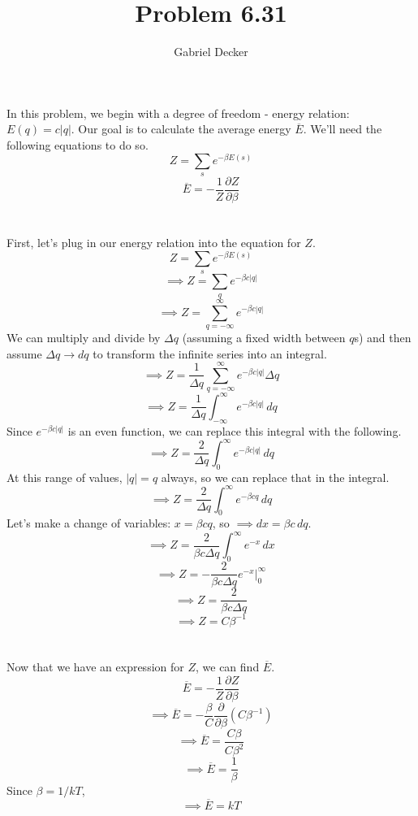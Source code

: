 \documentclass[12pt]{article}
\title{Problem 6.31}
\author{Gabriel Decker}
\newcommand{\partDeriv}[2]{\frac{\partial #1}{\partial #2}}
\begin{document}
\maketitle
\begin{flushleft}

In this problem, we begin with a degree of freedom - energy relation: $E(q)=c|q|$. Our goal is to calculate the average energy $\overline{E}$.
We'll need the following equations to do so.
\begin{equation}
    Z=\sum_se^{-\beta E(s)}
\end{equation}
\begin{equation}
    \overline{E}=-\frac{1}{Z}\partDeriv{Z}{\beta}
\end{equation}\\~\\

First, let's plug in our energy relation into the equation for $Z$.
$$Z=\sum_se^{-\beta E(s)}$$
$$\implies Z=\sum_qe^{-\beta c|q|}$$
$$\implies Z=\sum_{q=-\infty}^\infty e^{-\beta c|q|}$$
We can multiply and divide by $\Delta q$ (assuming a fixed width between $q$s) and then assume $\Delta q\rightarrow dq$ to transform the infinite series into an integral.
$$\implies Z=\frac{1}{\Delta q}\sum_{q=-\infty}^\infty e^{-\beta c|q|}\Delta q$$
$$\implies Z=\frac{1}{\Delta q}\int_{-\infty}^\infty e^{-\beta c|q|}\,dq$$
Since $e^{-\beta c|q|}$ is an even function, we can replace this integral with the following.
$$\implies Z=\frac{2}{\Delta q}\int_0^\infty e^{-\beta c|q|}\,dq$$
At this range of values, $|q|=q$ always, so we can replace that in the integral.
$$\implies Z=\frac{2}{\Delta q}\int_0^\infty e^{-\beta cq}\,dq$$
Let's make a change of variables: $x=\beta cq$, so $\implies dx=\beta c\,dq$.
$$\implies Z=\frac{2}{\beta c\Delta q}\int_0^\infty e^{-x}\,dx$$
$$\implies Z=-\frac{2}{\beta c\Delta q}e^{-x}\Big|_0^\infty$$
$$\implies Z=\frac{2}{\beta c\Delta q}$$
$$\implies Z=C\beta^{-1}$$\\~\\

Now that we have an expression for $Z$, we can find $\overline{E}$.
$$\overline{E}=-\frac{1}{Z}\partDeriv{Z}{\beta}$$
$$\implies\overline{E}=-\frac{\beta}{C}\partDeriv{}{\beta}(C\beta^{-1})$$
$$\implies\overline{E}=\frac{C\beta}{C\beta^2}$$
$$\implies\overline{E}=\frac{1}{\beta}$$
Since $\beta=1/kT$,
$$\implies\overline{E}=kT$$



\end{flushleft}
\end{document}
